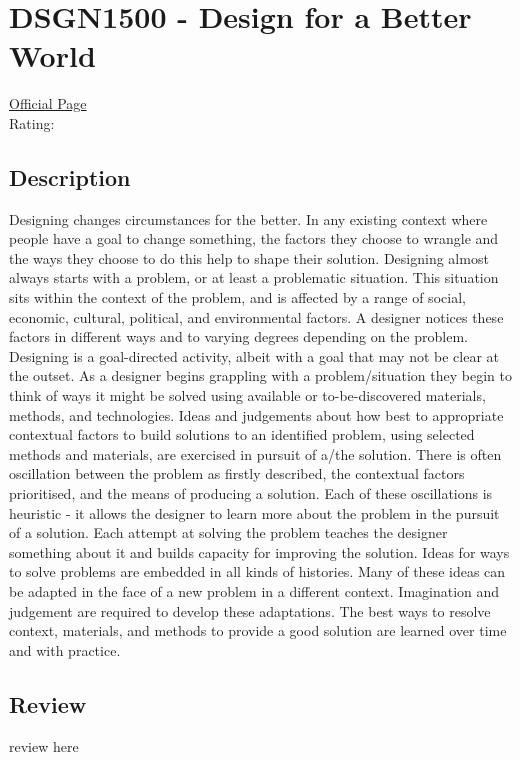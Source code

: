\hypertarget{DSGN1500}{\section{DSGN1500 - Design for a Better World}}

\large
\textcolor{turbo_purple}{\href{https://my.uq.edu.au/programs-courses/course.html?course_code=DSGN1500}{Official Page}} \\
Rating: \cstar\cstar\cstar\cstar\ostar

\normalsize
\subsection*{Description}
Designing changes circumstances for the better. In any existing context where people have a goal to change something, the factors they choose to wrangle and the ways they choose to do this help to shape their solution.
Designing almost always starts with a problem, or at least a problematic situation.
This situation sits within the context of the problem, and is affected by a range of social, economic, cultural, political, and environmental factors.
A designer notices these factors in different ways and to varying degrees depending on the problem.
Designing is a goal-directed activity, albeit with a goal that may not be clear at the outset.
As a designer begins grappling with a problem/situation they begin to think of ways it might be solved using available or to-be-discovered materials, methods, and technologies.
Ideas and judgements about how best to appropriate contextual factors to build solutions to an identified problem, using selected methods and materials, are exercised in pursuit of a/the solution.
There is often oscillation between the problem as firstly described, the contextual factors prioritised, and the means of producing a solution. Each of these oscillations is heuristic - it allows the designer to learn more about the problem in the pursuit of a solution.
Each attempt at solving the problem teaches the designer something about it and builds capacity for improving the solution.
Ideas for ways to solve problems are embedded in all kinds of histories.
Many of these ideas can be adapted in the face of a new problem in a different context.
Imagination and judgement are required to develop these adaptations.
The best ways to resolve context, materials, and methods to provide a good solution are learned over time and with practice.

\subsection*{Review}
review here
